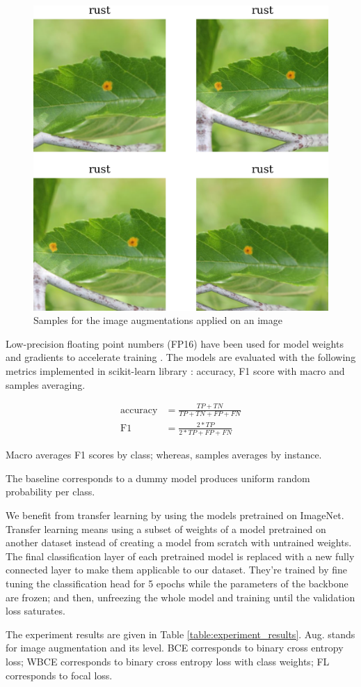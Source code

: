 \documentclass[conference]{IEEEtran}
\begin{document}
\begin{figure}[h]
    \centerline{\includegraphics[width = 0.45 \textwidth]{image-aug-3x3.png}}
    \caption{Samples for the image augmentations applied on an image}
    \label{fig:image-aug}
\end{figure}

Low-precision floating point numbers (FP16) have been used 
for model weights and gradients to accelerate training 
\cite{Micikevicius2018} \cite{BagOfTricks}.
The models are evaluated with the following metrics implemented 
in scikit-learn library \cite{sklearn_api}: 
accuracy, F1 score with macro and samples averaging.

\begin{align*}
    \text{accuracy} &= \frac{TP+TN}{TP+TN+FP+FN} \\
    \text{F1} &= \frac{2*TP}{2*TP+FP+FN}
\end{align*}

Macro averages F1 scores by class; whereas, samples averages by instance.


The baseline corresponds to a dummy model produces uniform random probability per class. 

We benefit from transfer learning by using the models pretrained on ImageNet. Transfer learning
means using a subset of weights of a model pretrained on another dataset instead of 
creating a model from scratch with untrained weights.
The final classification layer of each pretrained model is replaced with a new fully connected layer to make them applicable to our dataset. 
They're trained by fine tuning the classification head for 5 epochs while the parameters 
of the backbone are frozen; and then,
unfreezing the whole model and training until the validation loss saturates.

The experiment results are given in Table \ref{table:experiment_results}. 
Aug. stands for image augmentation and its level. 
BCE corresponds to binary cross entropy loss; WBCE corresponds to binary cross entropy loss with 
class weights; FL corresponds to focal loss.
\end{document}
